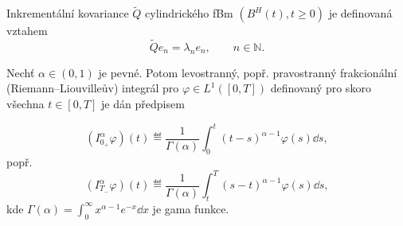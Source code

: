 \begin{definice}
    Inkrementální kovariance $\tilde{Q}$ cylindrického fBm $\left(B^H(t),t\geq0\right)$
    je definovaná vztahem
    $$ \tilde{Q}e_n = \lambda_n e_n, \qquad n\in\mathbb{N}. $$ 
\end{definice}


\begin{definice}\label{def:fracint}
    Nechť $\alpha\in \left( 0,1 \right)$ je pevné. Potom levostranný, popř.
    pravostranný frakcionální (Riemann--Liouvilleův) integrál pro
    $\varphi\in L^1 \left( \left[ 0,T \right] \right)$ definovaný pro skoro
    všechna $t\in\left[ 0,T \right]$ je dán předpisem
        
        $$\left( I_{0_+}^\alpha \varphi \right) \left( t \right) \eqdef
        \frac{1}{\Gamma(\alpha)}\int_{0}^{t} \left(t-s\right)^{\alpha-1} \varphi(s)
        \dd s,$$
    popř.
        $$\left( I_{T_-}^\alpha \varphi \right) \left( t \right) \eqdef
        \frac{1}{\Gamma(\alpha)}\int_{t}^{T} \left(s-t\right)^{\alpha-1} \varphi(s)
        \dd s,$$
        kde $\Gamma(\alpha)=\int_0^\infty x^{\alpha-1}e^{-x}\dd x$ je gama funkce.
\end{definice}


